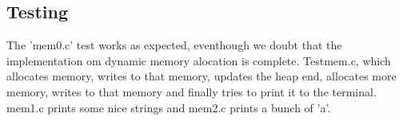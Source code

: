 \documentclass[12pt]{article}
\begin{document}
\subsection*{Testing}
The 'mem0.c' test works as expected, eventhough we doubt that the implementation om dynamic memory alocation is complete. Testmem.c, which allocates memory, writes to that memory, updates the heap end, allocates more memory, writes to that memory and finally tries to print it to the terminal. mem1.c prints some nice strings and mem2.c prints a bunch of 'a'. 
\end{document}
